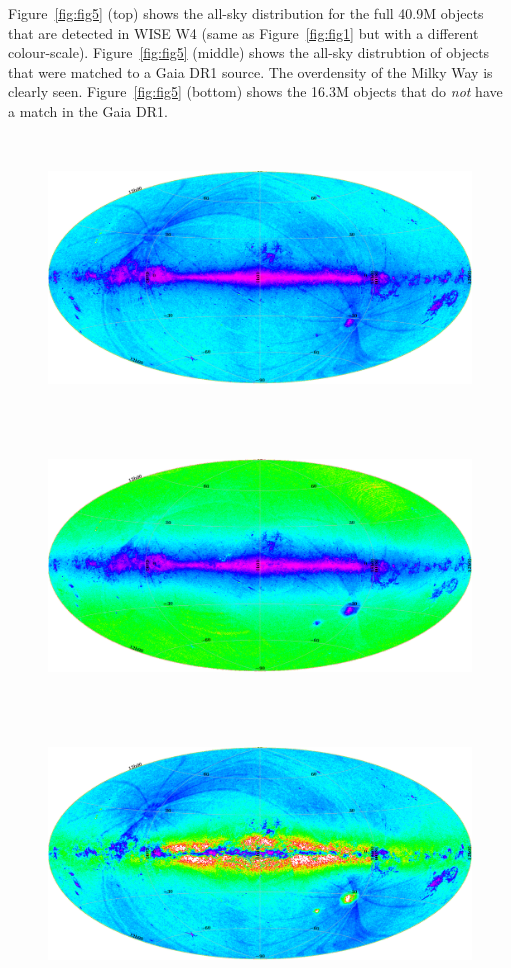 \documentclass[11pt,a4paper]{article}
\begin{document}
Figure~\ref{fig:fig5} (top) shows the all-sky distribution for the
full 40.9M objects that are detected in WISE W4 (same as
Figure~\ref{fig:fig1} but with a different
colour-scale). Figure~\ref{fig:fig5} (middle) shows the all-sky distrubtion of 
objects that were matched to a Gaia DR1 source. The overdensity of the Milky 
Way is clearly seen. Figure~\ref{fig:fig5} (bottom) shows the 16.3M objects 
that do {\it not} have a match in the Gaia DR1. 


\newpage
\centering
\begin{figure}
\begin{center}
    \includegraphics[height=7.5cm,width=14.0cm]{../../Gaia/plots/all_rainbow3.png}
    \includegraphics[height=7.5cm,width=14.0cm]{../../Gaia/plots/matches_rainbow3.png}
    \includegraphics[height=7.5cm,width=14.0cm]{../../Gaia/plots/nonmatches_rainbow3.png}

\end{center}
\end{figure}
\end{document}
